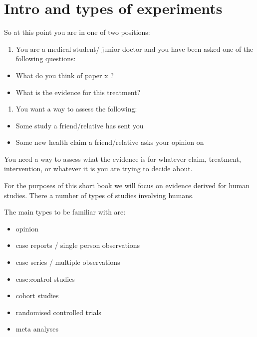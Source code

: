 \documentclass[
]{book}
\providecommand{\tightlist}{%
  \setlength{\itemsep}{0pt}\setlength{\parskip}{0pt}}
\theoremstyle{definition}
\theoremstyle{definition}
\theoremstyle{definition}
\theoremstyle{definition}
\theoremstyle{remark}
\begin{document}
\hypertarget{intro-and-types-of-experiments}{%
\chapter{Intro and types of experiments}\label{intro-and-types-of-experiments}}

So at this point you are in one of two positions:

\begin{enumerate}
\def\labelenumi{\arabic{enumi})}
\tightlist
\item
  You are a medical student/ junior doctor and you have been asked one of the following questions:
\end{enumerate}

\begin{itemize}
\tightlist
\item
  What do you think of paper x ?
\item
  What is the evidence for this treatment?
\end{itemize}

\begin{enumerate}
\def\labelenumi{\arabic{enumi})}
\setcounter{enumi}{1}
\tightlist
\item
  You want a way to assess the following:
\end{enumerate}

\begin{itemize}
\tightlist
\item
  Some study a friend/relative has sent you
\item
  Some new health claim a friend/relative asks your opinion on
\end{itemize}

You need a way to assess what the evidence is for whatever claim, treatment, intervention, or whatever it is you are trying to decide about.

For the purposes of this short book we will focus on evidence derived for human studies. There a number of types of studies involving humans.

The main types to be familiar with are:

\begin{itemize}
\tightlist
\item
  opinion
\item
  case reports / single person observations
\item
  case series / multiple observations
\item
  case:control studies
\item
  cohort studies
\item
  randomised controlled trials
\item
  meta analyses
\end{itemize}
\end{document}
